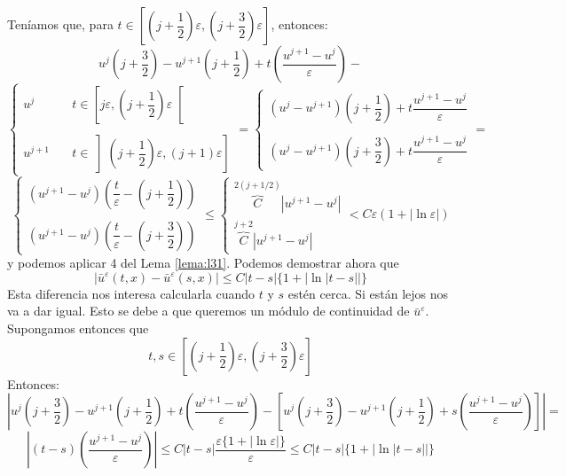 Teníamos que, para $t \in \left[ \left(j + \dfrac{1}{2}\right)\varepsilon, \left(j + \dfrac{3}{2}\right)\varepsilon \right]$, entonces:
$$u^j \left(j + \dfrac{3}{2} \right) - u^{j+1} \left(j + \dfrac{1}{2} \right) + t \left( \dfrac{u^{j+1} - u^j}{\varepsilon} \right) - $$
$$
\begin{cases}
    u^j \quad &t \in \left[ j \varepsilon, \left(j + \dfrac{1}{2} \right)\varepsilon \right[ \\\\
    u^{j+1} \quad &t \in \left] \left(j + \dfrac{1}{2} \right)\varepsilon, \left(j + 1 \right)\varepsilon \right]
\end{cases} = 
\begin{cases}
    (u^{j} - u^{j+1}) \left( j + \dfrac{1}{2} \right) + t \dfrac{u^{j+1} - u^j}{\varepsilon} \\\\
    (u^{j} - u^{j+1}) \left( j + \dfrac{3}{2} \right) + t \dfrac{u^{j+1} - u^j}{\varepsilon}
\end{cases} = $$
$$
\begin{cases}
    (u^{j+1} - u^{j}) \left( \dfrac{t}{\varepsilon} - \left( j + \dfrac{1}{2} \right) \right) \\\\
    (u^{j+1} - u^{j}) \left( \dfrac{t}{\varepsilon} - \left( j + \dfrac{3}{2} \right) \right)
\end{cases} \leq 
\begin{cases}
    \overbrace{C}^{2(j + 1/2)} |u^{j+1} - u^j| \\
    \overbrace{C}^{j + 2} |u^{j+1} - u^j|
\end{cases} < C \varepsilon(1 + |\ln \varepsilon|)$$
y podemos aplicar 4 del Lema \ref{lema:l31}. Podemos demostrar ahora que 
$$|\bar{u}^\varepsilon(t,x) - \bar{u}^\varepsilon(s,x)| \leq C |t-s| \{1 + |\ln|t-s||\}$$
Esta diferencia nos interesa calcularla cuando $t$ y $s$ estén cerca. Si están lejos nos va a dar igual. Esto se debe a que queremos 
un módulo de continuidad de $\bar{u}^\varepsilon$. Supongamos entonces que 
$$t,s \in \left[ \left(j + \dfrac{1}{2}\right)\varepsilon, \left(j + \dfrac{3}{2}\right)\varepsilon \right]$$
Entonces:
$$\left|u^j \left(j + \dfrac{3}{2} \right) - u^{j+1} \left(j + \dfrac{1}{2} \right) + t \left( \dfrac{u^{j+1} - u^j}{\varepsilon} \right) - 
\left[ u^{j} \left( j + \dfrac{3}{2} \right) - u^{j+1} \left( j + \dfrac{1}{2} \right) + s \left( \dfrac{u^{j+1} - u^j}{\varepsilon} \right) \right] \right| = $$
$$\left| (t-s) \left( \dfrac{u^{j+1} - u^j}{\varepsilon} \right) \right| \leq C |t-s| \dfrac{\varepsilon \{1 + |\ln \varepsilon|\}}{\varepsilon} \leq
C |t-s| \{1 + |\ln|t-s||\}$$

